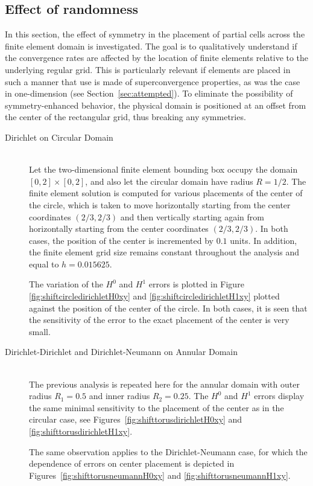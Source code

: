 \documentclass[12pt,twoside]{article}
\begin{document}
\subsection{Effect of randomness}\label{sec:random}
\par
In this section, the effect of symmetry in the placement of partial
cells across the finite element domain is investigated. The goal is to
qualitatively understand if the convergence rates are affected by the
location of finite elements relative to the underlying regular grid.
This is particularly relevant if elements are placed in such a manner
that use is made of superconvergence properties, as was the case in
one-dimension (see Section~\ref{sec:attempted}). To eliminate the
possibility of symmetry-enhanced behavior, the physical domain 
is positioned at an offset from the center of the rectangular grid,
thus breaking any symmetries. 
%
\begin{description}
\item[Dirichlet on Circular Domain]
\par\noindent
\\
Let the two-dimensional finite element bounding box occupy the domain 
$[0,2] \times [0,2]$, and also let the circular domain have radius 
$R = 1/2$. The finite element solution is computed for various
placements of the center of the circle, which is taken to move
horizontally starting from the center coordinates $(2/3,2/3)$ and then vertically starting
again from horizontally starting from the center coordinates $(2/3,2/3)$. In both cases, the
position of the center is incremented by $0.1$ units. In addition, the
finite element grid size remains constant throughout the analysis and
equal to $h=0.015625$. 
\par
The variation of the $H^0$ and $H^1$ errors is plotted in Figure 
\ref{fig:shiftcircledirichletH0xy} and \ref{fig:shiftcircledirichletH1xy}
plotted against the position of the center of the circle. In both
cases, it is seen that the sensitivity of the error to the exact
placement of the center is very small. 
%
\item[Dirichlet-Dirichlet and Dirichlet-Neumann on Annular Domain]
\par\noindent
\\
The previous analysis is repeated here for the annular domain with
outer radius $R_1=0.5$ and inner radius $R_2=0.25$. 
The $H^0$ and $H^1$ errors display the same
minimal sensitivity to the placement of the center as in the circular
case, see Figures~\ref{fig:shifttorusdirichletH0xy} and
\ref{fig:shifttorusdirichletH1xy}. 
\par
The same observation applies to the Dirichlet-Neumann case, for which
the dependence of errors on center placement is depicted in 
Figures~\ref{fig:shifttorusneumannH0xy} and 
\ref{fig:shifttorusneumannH1xy}. 
\end{description}
%
\end{document}
